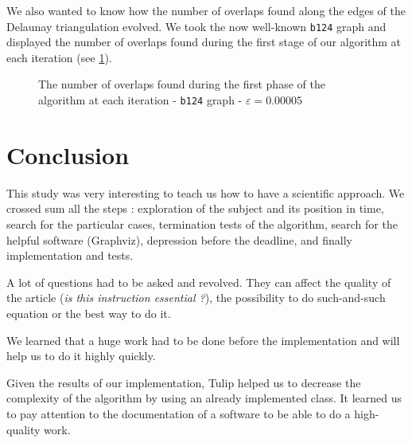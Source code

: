 \documentclass[12pt]{report}
\begin{document}
\bigskip
We also wanted to know how the number of overlaps found along the edges of the Delaunay triangulation evolved. We took the now well-known \texttt{b124} graph and displayed the number of overlaps found during the first stage of our algorithm at each iteration (see \ref{overlaps}).

\begin{figure}[h]
	\center
  \setlength\fboxsep{5pt}
  \setlength\fboxrule{0.5pt}
  
  \caption{The number of overlaps found during the first phase of the algorithm at each iteration - \texttt{b124} graph - $\varepsilon = 0.00005$}
  \label{overlaps}
\end{figure}



\chapter{Conclusion}

This study was very interesting to teach us how to have a scientific approach. We crossed sum all the steps : exploration of the subject and its position in time, search for the particular cases, termination tests of the algorithm, search for the helpful software (Graphviz), depression before the deadline, and finally implementation and tests. 

A lot of questions had to be asked and revolved. They can affect the quality of the article (\textit{is this instruction essential ?}), the possibility to do such-and-such equation or the best way to do it.

We learned that a huge work had to be done before the implementation and will help us to do it highly quickly.

Given the results of our implementation, Tulip helped us to decrease the complexity of the algorithm by using an already implemented class. It learned us to pay attention to the documentation of a software to be able to do a high-quality work.
\end{document}
